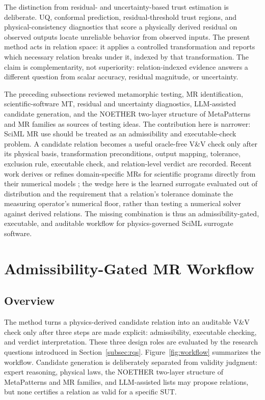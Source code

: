 \documentclass[preprint,12pt]{elsarticle}
\begin{document}
The distinction from residual- and uncertainty-based trust estimation is deliberate. UQ, conformal prediction, residual-threshold trust regions, and physical-consistency diagnostics that score a physically derived residual on observed outputs \citep{najafi2026} locate unreliable behavior from observed inputs. The present method acts in relation space: it applies a controlled transformation and reports which necessary relation breaks under it, indexed by that transformation. The claim is complementarity, not superiority: relation-indexed evidence answers a different question from scalar accuracy, residual magnitude, or uncertainty.

The preceding subsections reviewed metamorphic testing, MR identification, scientific-software MT, residual and uncertainty diagnostics, LLM-assisted candidate generation, and the NOETHER two-layer structure of MetaPatterns and MR families as sources of testing ideas. The contribution here is narrower: SciML MR use should be treated as an admissibility and executable-check problem. A candidate relation becomes a useful oracle-free V\&V check only after its physical basis, transformation preconditions, output mapping, tolerance, exclusion rule, executable check, and relation-level verdict are recorded. Recent work derives or refines domain-specific MRs for scientific programs directly from their numerical models \citep{yan2024elliptic,stevens2025mars}; the wedge here is the learned surrogate evaluated out of distribution and the requirement that a relation's tolerance dominate the measuring operator's numerical floor, rather than testing a numerical solver against derived relations. The missing combination is thus an admissibility-gated, executable, and auditable workflow for physics-governed SciML surrogate software.

\section{Admissibility-Gated MR Workflow}
\label{sec:method}

\subsection{Overview}
\label{subsec:method-overview}

The method turns a physics-derived candidate relation into an auditable V\&V check only after three steps are made explicit: admissibility, executable checking, and verdict interpretation. These three design roles are evaluated by the research questions introduced in Section~\ref{subsec:rqs}. Figure~\ref{fig:workflow} summarizes the workflow. Candidate generation is deliberately separated from validity judgment: expert reasoning, physical laws, the NOETHER two-layer structure of MetaPatterns and MR families, and LLM-assisted lists may propose relations, but none certifies a relation as valid for a specific SUT.
\end{document}
